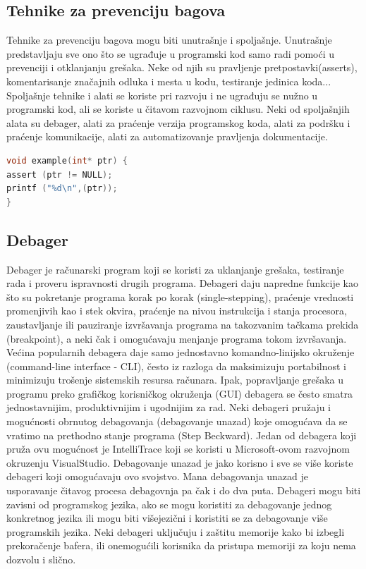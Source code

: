 \documentclass[a4paper]{article}
\begin{document}
\subsection{Tehnike za prevenciju bagova}
\label{subsec:Tehnike za prevenciju bagova}

Tehnike za prevenciju bagova mogu biti unutrašnje i spoljašnje. Unutrašnje predstavljaju sve ono što se ugrađuje u programski kod samo radi pomoći u prevenciji i otklanjanju grešaka. Neke od njih su pravljenje pretpostavki(asserts), komentarisanje značajnih odluka i mesta u kodu, testiranje jedinica koda... Spoljašnje tehnike i alati se koriste pri razvoju i ne ugrađuju se nužno u programski kod, ali se koriste u čitavom razvojnom ciklusu. Neki od spoljašnjih alata su debager, alati za praćenje verzija programskog koda, alati za podršku i praćenje komunikacije, alati za automatizovanje pravljenja dokumentacije\cite{bagovi_smalkov}.
\\

\begin{lstlisting}[language=C,caption=Primer korišćenja assert naredbe]
void example(int* ptr) {
assert (ptr != NULL);
printf ("%d\n",(ptr));
}
\end{lstlisting}


\subsection{Debager}
\label{subsec:Debager}

Debager je računarski program koji se koristi za uklanjanje grešaka, testiranje rada i proveru ispravnosti drugih programa. Debageri daju napredne funkcije kao što su pokretanje programa korak po korak (single-stepping), praćenje vrednosti promenjivih kao i stek okvira, praćenje na nivou instrukcija i stanja procesora, zaustavljanje ili pauziranje izvršavanja programa na takozvanim tačkama prekida (breakpoint), a neki čak i omogućavaju menjanje programa tokom izvršavanja.\\
\indent Većina popularnih debagera daje samo jednostavno komandno-linijsko okruženje (command-line interface - CLI), često iz razloga da maksimizuju portabilnost i minimizuju trošenje sistemskih resursa računara. Ipak, popravljanje grešaka u programu preko grafičkog korisničkog okruženja (GUI) debagera se često smatra jednostavnijim, produktivnijim i ugodnijim za rad. Neki debageri pružaju i mogućnosti obrnutog debagovanja (debagovanje unazad) koje omogućava da se vratimo na prethodno stanje programa (Step Beckward). Jedan od debagera koji pruža ovu mogućnost je IntelliTrace koji se koristi u Microsoft-ovom razvojnom okruzenju VisualStudio. Debagovanje unazad je jako korisno i sve se više koriste debageri koji omogućavaju ovo svojstvo. Mana debagovanja unazad je usporavanje čitavog procesa debagovnja pa čak i do dva puta. Debageri mogu biti zavisni od programskog jezika, ako se mogu koristiti za debagovanje jednog konkretnog jezika ili mogu biti višejezični i koristiti se za debagovanje više programskih jezika. Neki debageri uključuju i zaštitu memorije kako bi izbegli prekoračenje bafera, ili onemogućili korisnika da pristupa memoriji za koju nema dozvolu i slično.\cite{ssq_debug_def}
\end{document}
